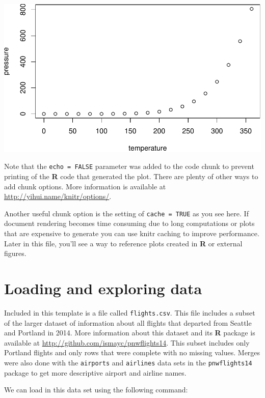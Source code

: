 \documentclass[12pt,twoside]{reedthesis}
\begin{document}
  \begin{center}\includegraphics{tesis_files/figure-latex/pressure-1} \end{center}
  
  Note that the \texttt{echo\ =\ FALSE} parameter was added to the code
  chunk to prevent printing of the \textbf{R} code that generated the
  plot. There are plenty of other ways to add chunk options. More
  information is available at \url{http://yihui.name/knitr/options/}.
  
  Another useful chunk option is the setting of \texttt{cache\ =\ TRUE} as
  you see here. If document rendering becomes time consuming due to long
  computations or plots that are expensive to generate you can use knitr
  caching to improve performance. Later in this file, you'll see a way to
  reference plots created in \textbf{R} or external figures.
  
  \section{Loading and exploring data}\label{loading-and-exploring-data}
  
  Included in this template is a file called \texttt{flights.csv}. This
  file includes a subset of the larger dataset of information about all
  flights that departed from Seattle and Portland in 2014. More
  information about this dataset and its \textbf{R} package is available
  at \url{http://github.com/ismayc/pnwflights14}. This subset includes
  only Portland flights and only rows that were complete with no missing
  values. Merges were also done with the \texttt{airports} and
  \texttt{airlines} data sets in the \texttt{pnwflights14} package to get
  more descriptive airport and airline names.
  
  We can load in this data set using the following command:
  
\end{document}
